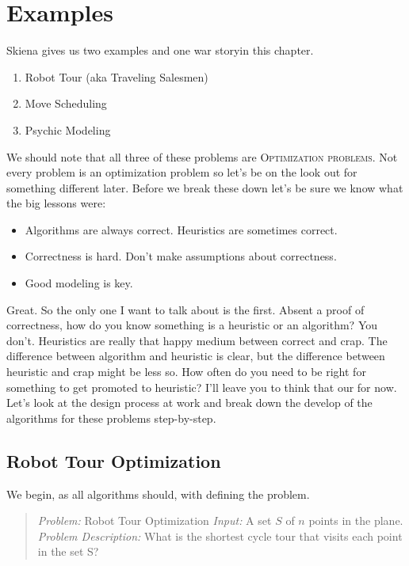 \documentclass[]{tufte-handout}
\begin{document}
\section{Examples}

Skiena gives us two examples and one war storyin this chapter.  
\begin{enumerate}
\item Robot Tour (aka Traveling Salesmen)
\item Move Scheduling 
\item Psychic Modeling
\end{enumerate}
We should note that all three of these problems are \textsc{Optimization problems}.  Not every problem is an optimization problem so let's be on the look out for something different later.  Before we break these down let's be sure we know what the big lessons were:
\begin{itemize}
\item Algorithms are always correct. Heuristics are sometimes correct.
\item Correctness is hard. Don't make assumptions about correctness.
\item Good modeling is key.
\end{itemize}
Great. So the only one I want to talk about is the first. Absent a proof of correctness, how do you know something is a heuristic or an algorithm?  You don't.  Heuristics are really that happy medium between correct and crap. The difference between algorithm and heuristic is clear, but the difference between heuristic and crap might be less so.  How often do you need to be right for something to get promoted to heuristic? I'll leave you to think that our for now. Let's look at the design process at work and break down the develop of the algorithms for these problems step-by-step.


\subsection{Robot Tour Optimization}

We begin, as all algorithms should, with defining the problem. 

\begin{quote}
\textit{Problem:} Robot Tour Optimization
\textit{Input:} A set $S$ of $n$ points in the plane.
\textit{Problem Description:} What is the shortest cycle tour that visits each point in the set S?
\end{quote}
\end{document}
